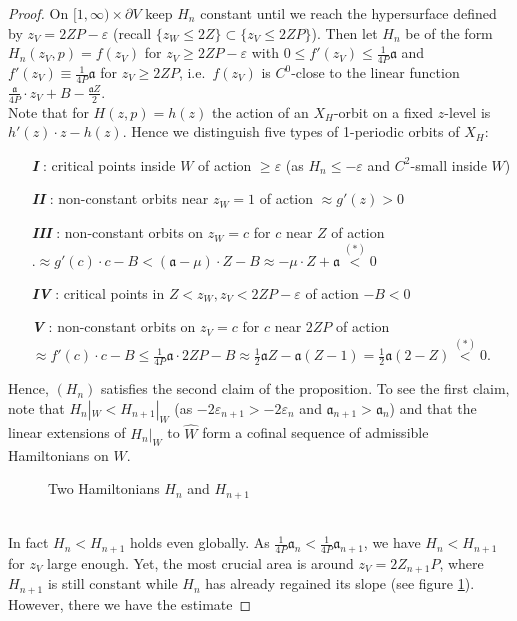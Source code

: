 \documentclass[a4paper,12pt,bibliography=totocnumbered,titlepage=false,abstracton,bookmarksnumbered=true]{scrartcl}
\newcommand{\veps}{\varepsilon}
\theoremstyle{definition}
\begin{document}
\begin{proof}
 On $[1,\infty){\times}\partial V$ keep $H_n$ constant until we reach the hypersurface defined by $z_V=2ZP{-}\veps$ (recall $\{z_W{\leq} 2Z\}\subset\{z_V{\leq} 2ZP\}$). Then let $H_n$ be of the form $H_n(z_V,p)=f(z_V)$ for $z_V\geq 2ZP{-}\veps$ with $0\leq f'(z_V)\leq \frac{1}{4P}\mathfrak{a}$ and $f'(z_V)\equiv\frac{1}{4P}\mathfrak{a}$ for $z_V\geq 2ZP$, i.e.\ $f(z_V)$ is $C^0$-close to the linear function $\frac{\mathfrak{a}}{4P}{\cdot} z_V + B - \frac{\mathfrak{a}Z}{2}$.\bigskip\\
 Note that for $H(z,p)=h(z)$ the action of an $X_H$-orbit on a fixed $z$-level is $h'(z)\cdot z-h(z)$. Hence we distinguish five types of 1-periodic orbits of $X_H$:
 \begin{itemize}
  \item[\textbf{\textit{I}}]: critical points inside $W$ of action $\geq\veps$ (as $H_n\leq-\veps$ and $C^2$-small inside $W$)
  \item[\textbf{\textit{II}}]: non-constant orbits near $z_W=1$ of action $\approx g'(z)>0$
  \item[\textbf{\textit{III}}]: non-constant orbits on $z_W=c$ for $c$ near $Z$ of action\\ $\Big.\approx g'(c)\cdot c-B<(\mathfrak{a}-\mu)\cdot Z-B\approx -\mu\cdot Z+\mathfrak{a}\overset{(\ast)}{<}0$ 
  \item[\textbf{\textit{IV}}]: critical points in $Z<z_W , z_V<2ZP-\veps$ of action $-B<0$
  \item[\textbf{\textit{V}}]: non-constant orbits on $z_V=c$ for $c$ near $2ZP$ of action\\ $\approx f'(c){\cdot} c-B\leq\frac{1}{4P}\mathfrak{a}{\cdot} 2ZP-B\approx\frac{1}{2}\mathfrak{a}Z-\mathfrak{a}(Z{-}1)=\frac{1}{2}\mathfrak{a}(2{-}Z)\overset{(\ast)}{<}0.$
 \end{itemize}
Hence, $(H_n)$ satisfies the second claim of the proposition. To see the first claim, note that $H_n|_W<H_{n+1}|_W$ (as $-2\veps_{n+1}>-2\veps_n$ and $\mathfrak{a}_{n+1}>\mathfrak{a}_n$) and that the linear extensions of $H_n|_W$ to $\widehat{W}$ form a cofinal sequence of admissible Hamiltonians on $W$.
\begin{figure}[ht]
\centering
 \resizebox{10cm}{!}{}
 \caption{\label{fighomo}Two Hamiltonians $H_n$ and $H_{n+1}$}
\end{figure}\\
In fact $H_n<H_{n+1}$ holds even globally. As $\frac{1}{4P}\mathfrak{a}_n<\frac{1}{4P}\mathfrak{a}_{n+1}$, we have $H_n<H_{n+1}$ for $z_V$ large enough. Yet, the most crucial area is around $z_V=2Z_{n+1}P$, where $H_{n+1}$ is still constant while $H_n$ has already regained its slope (see figure \ref{fighomo}). However, there we have the estimate

\end{proof}
\end{document}
